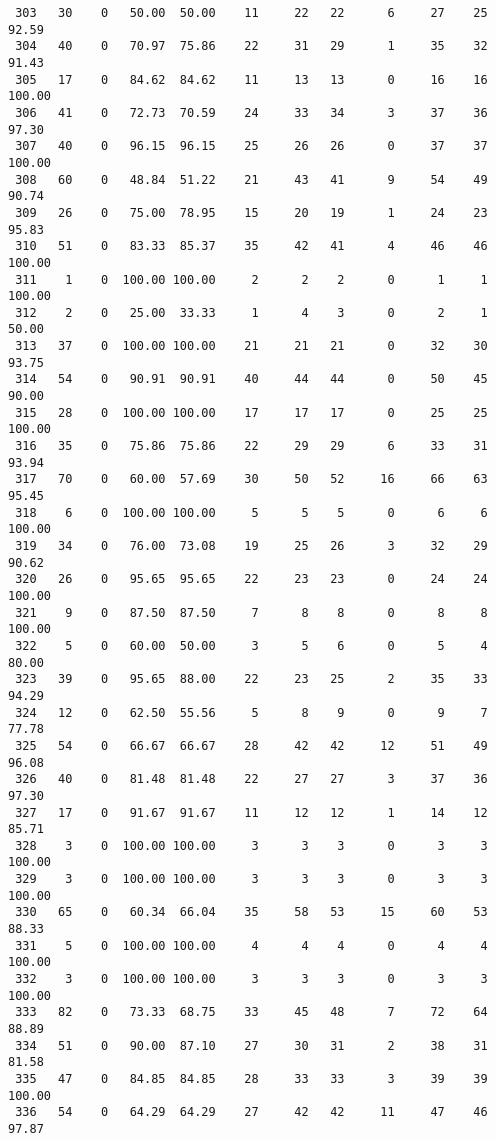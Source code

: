 \begin{verbatim}
 303   30    0   50.00  50.00    11     22   22      6     27    25    92.59
 304   40    0   70.97  75.86    22     31   29      1     35    32    91.43
 305   17    0   84.62  84.62    11     13   13      0     16    16   100.00
 306   41    0   72.73  70.59    24     33   34      3     37    36    97.30
 307   40    0   96.15  96.15    25     26   26      0     37    37   100.00
 308   60    0   48.84  51.22    21     43   41      9     54    49    90.74
 309   26    0   75.00  78.95    15     20   19      1     24    23    95.83
 310   51    0   83.33  85.37    35     42   41      4     46    46   100.00
 311    1    0  100.00 100.00     2      2    2      0      1     1   100.00
 312    2    0   25.00  33.33     1      4    3      0      2     1    50.00
 313   37    0  100.00 100.00    21     21   21      0     32    30    93.75
 314   54    0   90.91  90.91    40     44   44      0     50    45    90.00
 315   28    0  100.00 100.00    17     17   17      0     25    25   100.00
 316   35    0   75.86  75.86    22     29   29      6     33    31    93.94
 317   70    0   60.00  57.69    30     50   52     16     66    63    95.45
 318    6    0  100.00 100.00     5      5    5      0      6     6   100.00
 319   34    0   76.00  73.08    19     25   26      3     32    29    90.62
 320   26    0   95.65  95.65    22     23   23      0     24    24   100.00
 321    9    0   87.50  87.50     7      8    8      0      8     8   100.00
 322    5    0   60.00  50.00     3      5    6      0      5     4    80.00
 323   39    0   95.65  88.00    22     23   25      2     35    33    94.29
 324   12    0   62.50  55.56     5      8    9      0      9     7    77.78
 325   54    0   66.67  66.67    28     42   42     12     51    49    96.08
 326   40    0   81.48  81.48    22     27   27      3     37    36    97.30
 327   17    0   91.67  91.67    11     12   12      1     14    12    85.71
 328    3    0  100.00 100.00     3      3    3      0      3     3   100.00
 329    3    0  100.00 100.00     3      3    3      0      3     3   100.00
 330   65    0   60.34  66.04    35     58   53     15     60    53    88.33
 331    5    0  100.00 100.00     4      4    4      0      4     4   100.00
 332    3    0  100.00 100.00     3      3    3      0      3     3   100.00
 333   82    0   73.33  68.75    33     45   48      7     72    64    88.89
 334   51    0   90.00  87.10    27     30   31      2     38    31    81.58
 335   47    0   84.85  84.85    28     33   33      3     39    39   100.00
 336   54    0   64.29  64.29    27     42   42     11     47    46    97.87

\end{verbatim}

